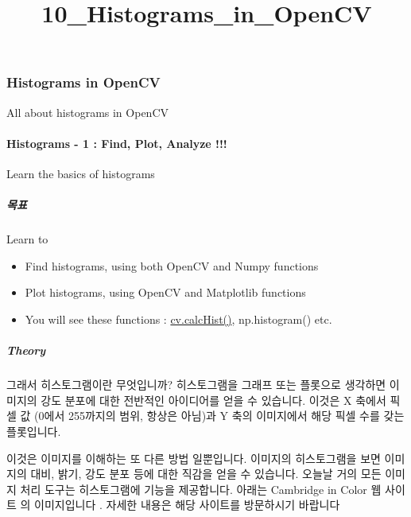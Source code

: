 \documentclass[11pt]{article}
\title{10\_Histograms\_in\_OpenCV}
\providecommand{\tightlist}{%
      \setlength{\itemsep}{0pt}\setlength{\parskip}{0pt}}
\begin{document}
    
    
    \maketitle
    
    

    
    \hypertarget{histograms-in-opencv}{%
\subsubsection{Histograms in OpenCV}\label{histograms-in-opencv}}

All about histograms in OpenCV

\hypertarget{histograms---1-find-plot-analyze}{%
\paragraph{Histograms - 1 : Find, Plot, Analyze
!!!}\label{histograms---1-find-plot-analyze}}

Learn the basics of histograms

\hypertarget{uxbaa9uxd45c}{%
\subparagraph{목표}\label{uxbaa9uxd45c}}

Learn to

\begin{itemize}
\tightlist
\item
  Find histograms, using both OpenCV and Numpy functions
\item
  Plot histograms, using OpenCV and Matplotlib functions
\item
  You will see these functions :
  \href{https://docs.opencv.org/3.4/d6/dc7/group__imgproc__hist.html\#ga4b2b5fd75503ff9e6844cc4dcdaed35d}{cv.calcHist()},
  np.histogram() etc.
\end{itemize}

\hypertarget{theory}{%
\subparagraph{Theory}\label{theory}}

그래서 히스토그램이란 무엇입니까? 히스토그램을 그래프 또는 플롯으로
생각하면 이미지의 강도 분포에 대한 전반적인 아이디어를 얻을 수 있습니다.
이것은 X 축에서 픽셀 값 (0에서 255까지의 범위, 항상은 아님)과 Y 축의
이미지에서 해당 픽셀 수를 갖는 플롯입니다.

이것은 이미지를 이해하는 또 다른 방법 일뿐입니다. 이미지의 히스토그램을
보면 이미지의 대비, 밝기, 강도 분포 등에 대한 직감을 얻을 수 있습니다.
오늘날 거의 모든 이미지 처리 도구는 히스토그램에 기능을 제공합니다.
아래는 Cambridge in Color 웹 사이트 의 이미지입니다 . 자세한 내용은 해당
사이트를 방문하시기 바랍니다
\end{document}

